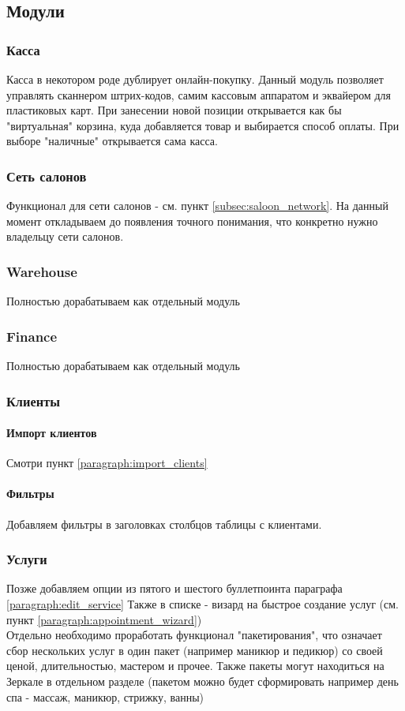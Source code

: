 \documentclass[DIV=calc, paper=a4, fontsize=11pt]{scrartcl} %
\begin{document}
\subsection{Модули}
\subsubsection{Касса}
Касса в некотором роде дублирует онлайн-покупку. Данный модуль позволяет управлять сканнером штрих-кодов, самим кассовым аппаратом и эквайером для пластиковых карт. При занесении новой позиции открывается как бы "виртуальная" корзина, куда добавляется товар и выбирается способ оплаты. При выборе "наличные" открывается сама касса.
\subsubsection{Сеть салонов}
Функционал для сети салонов - см. пункт \ref{subsec:saloon_network}. На данный момент откладываем до появления точного понимания, что конкретно нужно владельцу сети салонов.
\subsubsection{Warehouse}
Полностью дорабатываем как отдельный модуль
\subsubsection{Finance}
Полностью дорабатываем как отдельный модуль
\subsubsection{Клиенты}
\paragraph{Импорт клиентов} Смотри пункт \ref{paragraph:import_clients}
\paragraph{Фильтры} Добавляем фильтры в заголовках столбцов таблицы с клиентами.
\subsubsection{Услуги}
Позже добавляем опции из пятого и шестого буллетпоинта параграфа \ref{paragraph:edit_service}
Также в списке - визард на быстрое создание услуг (см. пункт \ref{paragraph:appointment_wizard})
\\[0.5cm]
Отдельно необходимо проработать функционал "пакетирования", что означает сбор нескольких услуг в один пакет (например маникюр и педикюр) со своей ценой, длительностью, мастером и прочее. Также пакеты могут находиться на Зеркале в отдельном разделе (пакетом можно будет сформировать например день спа - массаж, маникюр, стрижку, ванны)
\end{document}
